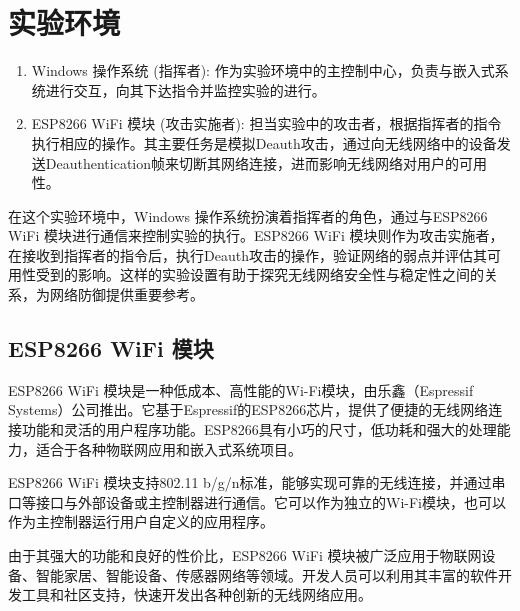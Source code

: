 \documentclass[../main.tex]{subfiles}
\begin{document}
\section{实验环境}
\begin{enumerate}
  \item Windows 操作系统 (指挥者): 作为实验环境中的主控制中心，负责与嵌入式系统进行交互，向其下达指令并监控实验的进行。
  \item ESP8266 WiFi 模块 (攻击实施者):
    担当实验中的攻击者，根据指挥者的指令执行相应的操作。其主要任务是模拟Deauth攻击，通过向无线网络中的设备发送Deauthentication帧来切断其网络连接，进而影响无线网络对用户的可用性。
\end{enumerate}

在这个实验环境中，Windows 操作系统扮演着指挥者的角色，通过与ESP8266 WiFi
模块进行通信来控制实验的执行。ESP8266 WiFi
模块则作为攻击实施者，在接收到指挥者的指令后，执行Deauth攻击的操作，验证网络的弱点并评估其可用性受到的影响。这样的实验设置有助于探究无线网络安全性与稳定性之间的关系，为网络防御提供重要参考。
%
\subsection*{ESP8266 WiFi 模块}
ESP8266 WiFi 模块是一种低成本、高性能的Wi-Fi模块，由乐鑫（Espressif Systems）公司推出。它基于Espressif的ESP8266芯片，提供了便捷的无线网络连接功能和灵活的用户程序功能。ESP8266具有小巧的尺寸，低功耗和强大的处理能力，适合于各种物联网应用和嵌入式系统项目。

ESP8266 WiFi 模块支持802.11 b/g/n标准，能够实现可靠的无线连接，并通过串口等接口与外部设备或主控制器进行通信。它可以作为独立的Wi-Fi模块，也可以作为主控制器运行用户自定义的应用程序。

由于其强大的功能和良好的性价比，ESP8266 WiFi 模块被广泛应用于物联网设备、智能家居、智能设备、传感器网络等领域。开发人员可以利用其丰富的软件开发工具和社区支持，快速开发出各种创新的无线网络应用。
\end{document}

